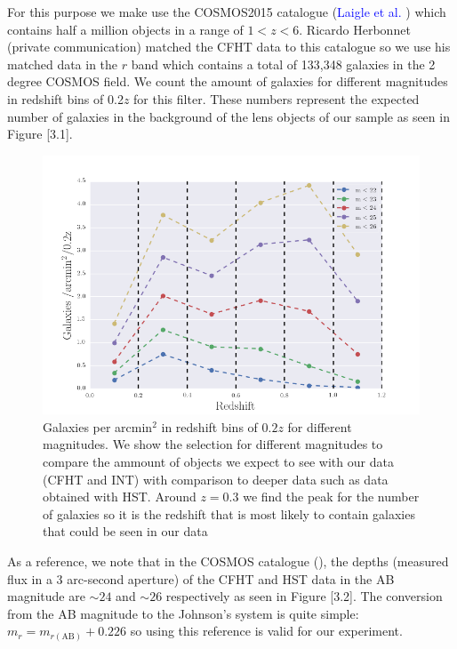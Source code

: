 For this purpose we make use the COSMOS2015 catalogue (\textcolor{blue}{Laigle et al.} \citeyear{Reference21}) which contains half a million objects in a range of $1<z<6$. Ricardo Herbonnet (private communication) matched the CFHT data to this catalogue so we use his matched data in the $r$ band which contains a total of 133,348 galaxies in the 2 degree COSMOS field. We count the amount of galaxies for different magnitudes in redshift bins of 0.2$z$ for this filter. These numbers represent the expected number of galaxies in the background of the lens objects of our sample as seen in Figure [3.1]. 

\begin{figure}[H]
\centering
\includegraphics[width=12cm]{images/galaxies_per_arcmin.png}
\caption[Galaxies per arcmin]{Galaxies per arcmin$^2$ in redshift bins of $0.2z$ for different magnitudes. We show the selection for different magnitudes to compare the ammount of objects we expect to see with our data (CFHT and INT) with comparison to deeper data such as data obtained with HST. Around $z=0.3$ we find the peak for the number of galaxies so it is the redshift that is most likely to contain galaxies that could be seen in our data}
\end{figure}

As a reference, we note that in the COSMOS catalogue (\citeyear{Reference35}), the depths (measured flux in a 3 arc-second aperture) of the CFHT and HST data in the AB magnitude are $\sim  24$ and $\sim 26$ respectively as seen in Figure [3.2]. The conversion from the AB magnitude to the Johnson's system is quite simple: $m_{r} =   m_{r(\text{AB})} + 0.226$ so using this reference is valid for our experiment.

